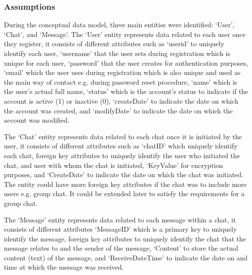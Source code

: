 \documentclass{article}
\begin{document}
\subsubsection{Assumptions}
During the conceptual data model, three main entities were identified: ‘User’, ‘Chat’, and ‘Message’. The ‘User’ entity represents data related to each user once they register, it consists of different attributes such as ‘userid’ to uniquely identify each user, ‘username’ that the user sets during registration which is unique for each user, ‘password’ that the user creates for authentication purposes, ‘email’ which the user uses during registration which is also unique and used as the main way of contact e.g. during password reset procedure, ‘name’ which is the user’s actual full name, ‘status’ which is the account’s status to indicate if the account is active (1)  or inactive (0), ‘createDate’ to indicate the date on which the account was created, and ‘modifyDate’ to indicate the date on which the account was modified. \par
The ‘Chat’ entity represents data related to each chat once it is initiated by the user, it consists of different attributes such as ‘chatID’ which uniquely identify each chat, foreign key attributes to uniquely identify the user who initiated the chat, and user with whom the chat is initiated, ‘KeyValue’ for encryption purposes, and ‘CreateDate’ to indicate the date on which the chat was initiated. The entity could have more foreign key attributes if the chat was to include more users e.g. group chat. It could be extended later to satisfy the requirements for a group chat. \par
The ‘Message’ entity represents data related to each message within a chat, it consists of different attributes ‘MessageID’ which is a primary key to uniquely identify the message, foreign key attributes to uniquely identify the chat that the message relates to and the sender of the message, ‘Content’ to store the actual content (text) of the message, and ‘ReceiveDateTime’ to indicate the date on and time at which the message was received. \par
\end{document}
